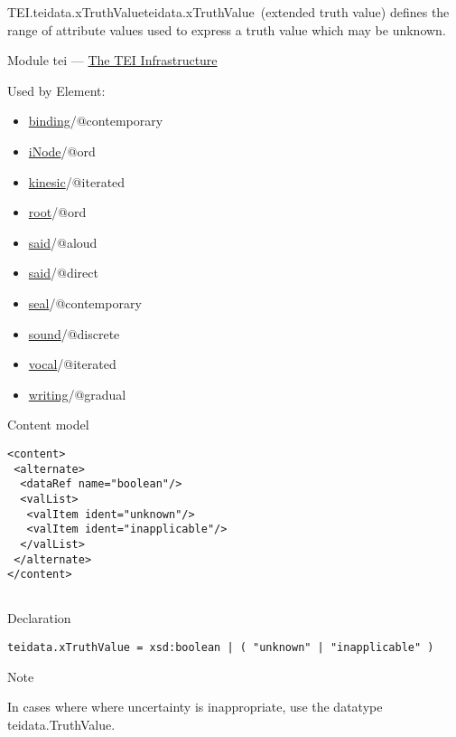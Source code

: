 \begin{reflist}
\item[]\begin{specHead}{TEI.teidata.xTruthValue}{teidata.xTruthValue} (extended truth value) defines the range of attribute values used to express a truth value which may be unknown.\end{specHead} 
    \item[{Module}]
  tei — \hyperref[ST]{The TEI Infrastructure}
    \item[{Used by}]
  Element: \begin{itemize}
\item \hyperref[TEI.binding]{binding}/@contemporary
\item \hyperref[TEI.iNode]{iNode}/@ord
\item \hyperref[TEI.kinesic]{kinesic}/@iterated
\item \hyperref[TEI.root]{root}/@ord
\item \hyperref[TEI.said]{said}/@aloud
\item \hyperref[TEI.said]{said}/@direct
\item \hyperref[TEI.seal]{seal}/@contemporary
\item \hyperref[TEI.sound]{sound}/@discrete
\item \hyperref[TEI.vocal]{vocal}/@iterated
\item \hyperref[TEI.writing]{writing}/@gradual
\end{itemize} 
    \item[{Content model}]
  \mbox{}\hfill\\[-10pt]\begin{Verbatim}[fontsize=\small]
<content>
 <alternate>
  <dataRef name="boolean"/>
  <valList>
   <valItem ident="unknown"/>
   <valItem ident="inapplicable"/>
  </valList>
 </alternate>
</content>
    
\end{Verbatim}

    \item[{Declaration}]
  \mbox{}\hfill\\[-10pt]\begin{Verbatim}[fontsize=\small]
teidata.xTruthValue = xsd:boolean | ( "unknown" | "inapplicable" )
\end{Verbatim}

    \item[{Note}]
  \par
In cases where where uncertainty is inappropriate, use the datatype \textsf{teidata.TruthValue}.
\end{reflist}  